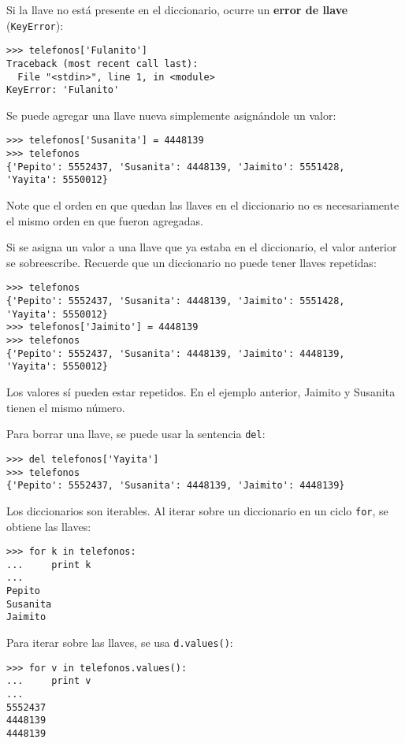 Si la llave no está presente en el diccionario, ocurre un \textbf{error
de llave} (\lstinline!KeyError!):

\begin{lstlisting}
>>> telefonos['Fulanito']
Traceback (most recent call last):
  File "<stdin>", line 1, in <module>
KeyError: 'Fulanito'
\end{lstlisting}

Se puede agregar una llave nueva simplemente asignándole un valor:

\begin{lstlisting}
>>> telefonos['Susanita'] = 4448139
>>> telefonos
{'Pepito': 5552437, 'Susanita': 4448139, 'Jaimito': 5551428,
'Yayita': 5550012}
\end{lstlisting}

Note que el orden en que quedan las llaves en el diccionario no es
necesa\-ria\-mente el mismo orden en que fueron agregadas.

Si se asigna un valor a una llave que ya estaba en el diccionario, el
valor anterior se sobreescribe. Recuerde que un diccionario no puede
tener llaves repetidas:

\begin{lstlisting}
>>> telefonos
{'Pepito': 5552437, 'Susanita': 4448139, 'Jaimito': 5551428,
'Yayita': 5550012}
>>> telefonos['Jaimito'] = 4448139
>>> telefonos
{'Pepito': 5552437, 'Susanita': 4448139, 'Jaimito': 4448139,
'Yayita': 5550012}
\end{lstlisting}

Los valores sí pueden estar repetidos. En el ejemplo anterior, Jaimito y
Susanita tienen el mismo número.

Para borrar una llave, se puede usar la sentencia \lstinline!del!:

\begin{lstlisting}
>>> del telefonos['Yayita']
>>> telefonos
{'Pepito': 5552437, 'Susanita': 4448139, 'Jaimito': 4448139}
\end{lstlisting}

Los diccionarios son iterables. Al iterar sobre un diccionario en un
ciclo \lstinline!for!, se obtiene las llaves:

\begin{lstlisting}
>>> for k in telefonos:
...     print k
...
Pepito
Susanita
Jaimito
\end{lstlisting}

Para iterar sobre las llaves, se usa \lstinline!d.values()!:

\begin{lstlisting}
>>> for v in telefonos.values():
...     print v
...
5552437
4448139
4448139
\end{lstlisting}

